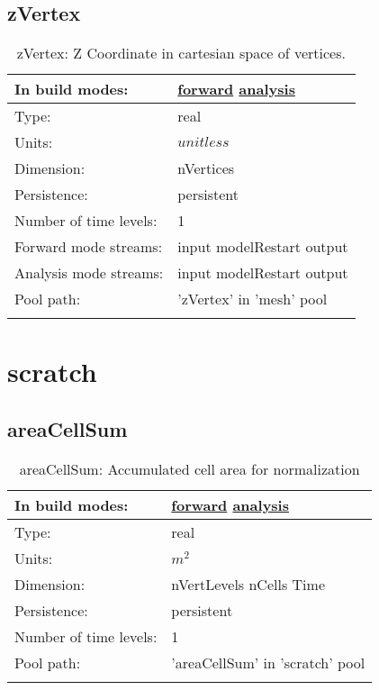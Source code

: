\subsection[zVertex]{zVertex}
\label{subsec:var_sec_mesh_zVertex}
\begin{center}
\begin{longtable}{| p{2.0in} | p{4.0in} |}
        \hline 
        In build modes: & \hyperref[subsec:forward_var_tab_mesh]{forward} \hyperref[subsec:analysis_var_tab_mesh]{analysis} \\
        \hline 
        Type: & real \\
        \hline 
        Units: & $unitless$ \\
        \hline 
        Dimension: & nVertices \\
        \hline 
        Persistence: & persistent \\
        \hline 
        Number of time levels: & 1 \\
        \hline 
		 Forward mode streams: &  input modelRestart output \\
        \hline 
		 Analysis mode streams: &  input modelRestart output \\
        \hline 
            Pool path: & 'zVertex' in 'mesh' pool
 \\
		 \hline 
    \caption{zVertex: Z Coordinate in cartesian space of vertices.}
\end{longtable}
\end{center}
\section[scratch]{scratch}
\label{sec:var_sec_scratch}
\subsection[areaCellSum]{areaCellSum}
\label{subsec:var_sec_scratch_areaCellSum}
\begin{center}
\begin{longtable}{| p{2.0in} | p{4.0in} |}
        \hline 
        In build modes: & \hyperref[subsec:forward_var_tab_scratch]{forward} \hyperref[subsec:analysis_var_tab_scratch]{analysis} \\
        \hline 
        Type: & real \\
        \hline 
        Units: & $m^{2}$ \\
        \hline 
        Dimension: & nVertLevels nCells Time \\
        \hline 
        Persistence: & persistent \\
        \hline 
        Number of time levels: & 1 \\
        \hline 
            Pool path: & 'areaCellSum' in 'scratch' pool
 \\
		 \hline 
    \caption{areaCellSum: Accumulated cell area for normalization}
\end{longtable}
\end{center}
